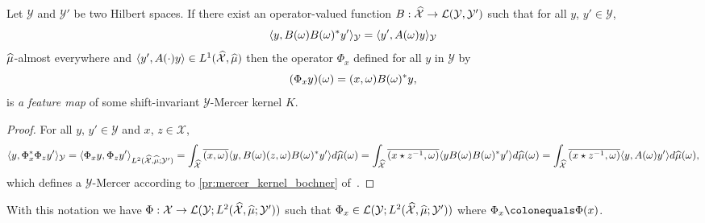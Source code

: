 \begin{proposition}\label{pr:fourier_feature_map}
Let $\mathcal{Y}$ and $\mathcal{Y}'$ be two Hilbert spaces. If there exist an operator-valued function $B:\widehat{\mathcal{X}}\to\mathcal{L}(\mathcal{Y},\mathcal{Y}')$ such that for all $y$, $y'\in\mathcal{Y}$,
\begin{dmath*}
\inner{y, B(\omega)B(\omega)^\adjoint y'}_{\mathcal{Y}}=\inner{y', A(\omega)y}_{\mathcal{Y}}
\end{dmath*}
$\widehat{\mu}$-almost everywhere and $\langle y', A(\cdot)y\rangle\in L^1(\widehat{\mathcal{X}},\widehat{\mu})$ then the operator $\Phi_x$ defined for all $y$ in $\mathcal{Y}$ by
\begin{dmath}
\label{eq:feature_shiftinv_map}
(\Phi_x y)(\omega)=\pairing{x,\omega}B(\omega)^\adjoint y,
\end{dmath}
is \emph{a feature map} of some shift-invariant $\mathcal{Y}$-Mercer kernel $K$.
\end{proposition}
\begin{proof}
For all $y$, $y'\in \mathcal{Y}$ and $x$, $z\in\mathcal{X}$,
\begin{dmath*}
\inner{y, \Phi_x^\adjoint \Phi_z y'}_{\mathcal{Y}} = \inner{\Phi_x y, \Phi_z y'}_{L^2(\dual{\mathcal{X}},\dual{\mu};\mathcal{Y}')}  \\
= \int_{\dual{\mathcal{X}}}\conj{\pairing{x,\omega}}\inner{y, B(\omega)\pairing{z,\omega}B(\omega)^\adjoint y'}d\dual{\mu}(\omega) \\
= \int_{\dual{\mathcal{X}}}\conj{\pairing{x \groupop \myinv{z},\omega}}\inner{y B(\omega)B(\omega)^\adjoint y'}d\dual{\mu}(\omega) \\
= \int_{\dual{\mathcal{X}}}\conj{\pairing{x \groupop \inv{z},\omega}}\inner{y,A(\omega)y'}d\dual{\mu}(\omega),
\end{dmath*}
which defines a $\mathcal{Y}$-Mercer according to \cref{pr:mercer_kernel_bochner} of~\citet{Carmeli2010}.
\end{proof}
With this notation we have $\Phi: \mathcal{X} \to \mathcal{L}(\mathcal{Y}; L^2(\widehat{\mathcal{X}}, \widehat{\mu}; \mathcal{Y}'))$ such that $\Phi_x\in \mathcal{L}(\mathcal{Y}; L^2(\widehat{\mathcal{X}}, \widehat{\mu}; \mathcal{Y}'))$ where $\Phi_x\colonequals\Phi(x)$.

